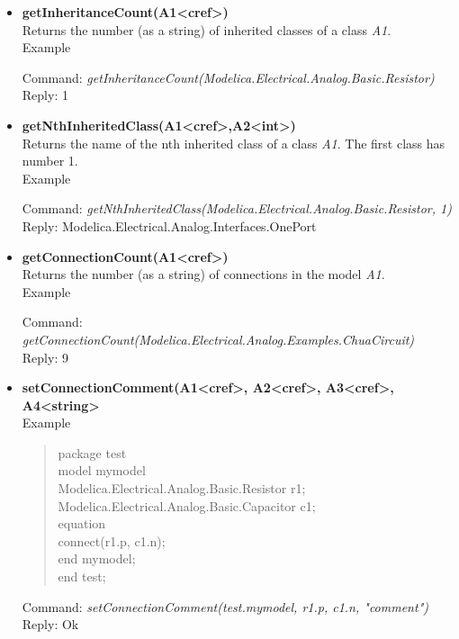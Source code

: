 \documentclass[11pt,a4paper,oneside,english]{book}
\newenvironment{modelicaExamples}{\begin{itemize}}{\end{itemize}}
\newcommand{\api}[2]{\item \textbf{#1} \\ #2}
\newcommand{\tab}{\hspace{2em}}
\newcommand{\command}[1]{Command: \textit{#1}\\}
\newcommand{\reply}[1]{Reply: #1}
\newcommand{\functionex}[2]{\begin{singlespace} \command{#1} \reply{#2} \end{singlespace}}
\newcommand{\examples}{Example}
\newenvironment{mocode}{\begin{verse}\begin{singlespace}\begin{scriptsize}\ttfamily}{\end{scriptsize}\end{singlespace}\end{verse}}
\begin{document}
\begin{modelicaExamples}
			\functionex{setComponentModifierValue(test.mymodel, r1.min, \$Code(()))}
			{Ok}

			\begin{mocode}
			\dots \\
			Modelica.Electrical.Analog.Basic.Resistor r1(start=2)=Resistor(R=2);\\
			\dots \\
			\end{mocode}
			\functionex{setComponentModifierValue(test.mymodel, r1, \$Code(()))}
			{Ok}

			\begin{mocode}
			\dots \\
			Modelica.Electrical.Analog.Basic.Resistor r1(start=2);\\
			\dots \\
			\end{mocode}
			\functionex{setComponentModifierValue(test.mymodel, r1.start, \$Code(()))}
			{Ok}

			\begin{mocode}
			\dots \\
			Modelica.Electrical.Analog.Basic.Resistor r1;\\
			\dots \\
			\end{mocode}

		\api{getInheritanceCount(A1<cref>)}{Returns the number (as a string) of inherited classes of a class \textit{A1}.\\
		\examples
		\functionex{getInheritanceCount(Modelica.Electrical.Analog.Basic.Resistor)}
		{1}
		}

		\api{getNthInheritedClass(A1<cref>,A2<int>)}{Returns the name of the nth inherited class of a class \textit{A1}. The first class has number 1.\\
		\examples
		\functionex{getNthInheritedClass(Modelica.Electrical.Analog.Basic.Resistor, 1)}
		{Modelica.Electrical.Analog.Interfaces.OnePort}
		}

		\api{getConnectionCount(A1<cref>)}{Returns the number (as a string) of connections in the model \textit{A1}.\\
		\examples
		\functionex{getConnectionCount(Modelica.Electrical.Analog.Examples.Chua\-Circuit)}
		{9}
		}

		\api{setConnectionComment(A1<cref>, A2<cref>, A3<cref>, A4<string>}{
		\examples
		\begin{mocode}
		package test\\
		\tab model mymodel\\
		\tab\tab Modelica.Electrical.Analog.Basic.Resistor r1;\\
		\tab\tab Modelica.Electrical.Analog.Basic.Capacitor c1;\\
		\tab equation\\
		\tab\tab connect(r1.p, c1.n);\\
		\tab end mymodel;\\
		end test;\\
		\end{mocode}
		\functionex{setConnectionComment(test.mymodel, r1.p, c1.n, "comment")}
		{Ok}

}
\end{modelicaExamples}
\end{document}
